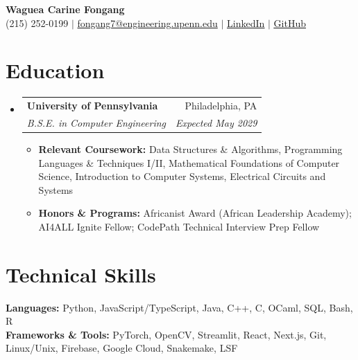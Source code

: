 \documentclass[letterpaper,10pt]{article}
\makeatletter
\newcommand{\resumeItem}[1]{\item \small{#1}}
\newcommand{\resumeSubheading}[4]{
\item \begin{tabularx}{\linewidth}{@{}X r@{}}
\textbf{#1} & \small #2 \\
\textit{\small #3} & \textit{\small #4}
\end{tabularx}\vspace{-2pt}
}
\newcommand{\resumeSubHeadingListStart}{
\begin{itemize}[
leftmargin=0pt,label={},itemsep=2pt,
topsep=2pt,parsep=0pt,partopsep=0pt
]
}
\newcommand{\resumeSubHeadingListEnd}{
\end{itemize}\vspace{2pt}
}
\newcommand{\resumeItemListStart}{
\begin{itemize}[
leftmargin=0.18in,label=\textbullet,
itemsep=1pt,topsep=1pt,parsep=0pt,partopsep=0pt
]
}
\newcommand{\resumeItemListEnd}{
\end{itemize}\vspace{1pt}
}
\makeatother
\begin{document}
\begin{center}
{\huge\textbf{Waguea Carine Fongang}} \\[3pt]
\small (215) 252-0199 $|$
\href{mailto:fongang7@engineering.upenn.edu}
{fongang7@engineering.upenn.edu} $|$
\href{https://www.linkedin.com/in/fongangcarine}
{\underline{LinkedIn}} $|$
\href{https://github.com/waguea}
{\underline{GitHub}}
\end{center}
\vspace{-12pt}
\section{Education}
\resumeSubHeadingListStart
\resumeSubheading
{University of Pennsylvania}
{Philadelphia, PA}
{B.S.E. in Computer Engineering}
{Expected May 2029}
\resumeItemListStart
\resumeItem{
\textbf{Relevant Coursework:} Data Structures \& Algorithms, Programming Languages \& Techniques I/II, Mathematical Foundations of Computer Science, Introduction to Computer Systems, Electrical Circuits and Systems
}
\resumeItem{
\textbf{Honors \& Programs:} Africanist Award (African Leadership Academy); AI4ALL Ignite Fellow; CodePath Technical Interview Prep Fellow
}
\resumeItemListEnd
\resumeSubHeadingListEnd
\section{Technical Skills}
{\small
\textbf{Languages:} Python, JavaScript/TypeScript, Java, C++, C, OCaml, SQL, Bash, R \\[2pt]
\textbf{Frameworks \& Tools:} PyTorch, OpenCV, Streamlit, React, Next.js, Git, Linux/Unix, Firebase, Google Cloud, Snakemake, LSF
}
\end{document}
